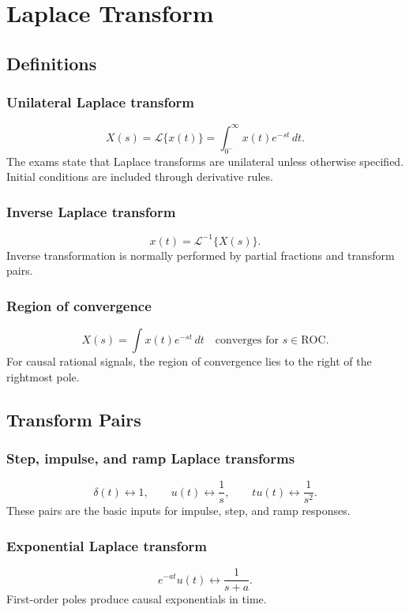 \section{Laplace Transform}

\subsection{Definitions}

\subsubsection{Unilateral Laplace transform}
\[
X(s)=\mathcal{L}\{x(t)\}=\int_{0^-}^{\infty}x(t)e^{-st}\,dt.
\]
The exams state that Laplace transforms are unilateral unless otherwise specified. Initial conditions are included through derivative rules.

\subsubsection{Inverse Laplace transform}
\[
x(t)=\mathcal{L}^{-1}\{X(s)\}.
\]
Inverse transformation is normally performed by partial fractions and transform pairs.

\subsubsection{Region of convergence}
\[
X(s)=\int x(t)e^{-st}\,dt \quad \text{converges for } s \in \mathrm{ROC}.
\]
For causal rational signals, the region of convergence lies to the right of the rightmost pole.

\subsection{Transform Pairs}

\subsubsection{Step, impulse, and ramp Laplace transforms}
\[
\delta(t)\leftrightarrow 1,\qquad
u(t)\leftrightarrow \frac{1}{s},\qquad
t u(t)\leftrightarrow \frac{1}{s^2}.
\]
These pairs are the basic inputs for impulse, step, and ramp responses.

\subsubsection{Exponential Laplace transform}
\[
e^{-at}u(t)\leftrightarrow \frac{1}{s+a}.
\]
First-order poles produce causal exponentials in time.

